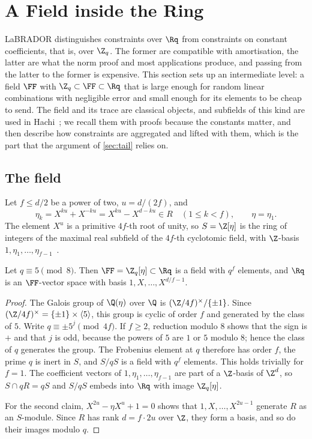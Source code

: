 \section{A Field inside the Ring}\label{sec:field}

LaBRADOR distinguishes constraints over $\Rq$ from constraints on constant coefficients, that is, over $\Z_q$. The former are compatible with amortisation, the latter are what the norm proof and most applications produce, and passing from the latter to the former is expensive. This section sets up an intermediate level: a field $\FF$ with $\Z_q\subset\FF\subset\Rq$ that is large enough for random linear combinations with negligible error and small enough for its elements to be cheap to send. The field and its trace are classical objects, and subfields of this kind are used in Hachi~\cite{NOZ26}; we recall them with proofs because the constants matter, and then describe how constraints are aggregated and lifted with them, which is the part that the argument of \cref{sec:tail} relies on.

\subsection{The field}

Let $f\le d/2$ be a power of two, $u=d/(2f)$, and
\[
\eta_k=X^{ku}+X^{-ku}=X^{ku}-X^{d-ku}\in R\quad(1\le k<f),\qquad \eta=\eta_1 .
\]
The element $X^u$ is a primitive $4f$-th root of unity, so $S=\Z[\eta]$ is the ring of integers of the maximal real subfield of the $4f$-th cyclotomic field, with $\Z$-basis $1,\eta_1,\dots,\eta_{f-1}$~\cite[Proposition~2.16]{Was97}.

\begin{lemma}\label{lem:field}
Let $q\equiv5\pmod8$. Then $\FF=\Z_q[\eta]\subset\Rq$ is a field with $q^f$ elements, and $\Rq$ is an $\FF$-vector space with basis $1,X,\dots,X^{d/f-1}$.
\end{lemma}
\begin{proof}
The Galois group of $\Q(\eta)$ over $\Q$ is $(\Z/4f)^\times/\{\pm1\}$. Since $(\Z/4f)^\times=\{\pm1\}\times\langle5\rangle$, this group is cyclic of order $f$ and generated by the class of $5$. Write $q\equiv\pm5^j\pmod{4f}$. If $f\ge2$, reduction modulo $8$ shows that the sign is $+$ and that $j$ is odd, because the powers of $5$ are $1$ or $5$ modulo $8$; hence the class of $q$ generates the group. The Frobenius element at $q$ therefore has order $f$, the prime $q$ is inert in $S$, and $S/qS$ is a field with $q^f$ elements. This holds trivially for $f=1$. The coefficient vectors of $1,\eta_1,\dots,\eta_{f-1}$ are part of a $\Z$-basis of $\Z^d$, so $S\cap qR=qS$ and $S/qS$ embeds into $\Rq$ with image $\Z_q[\eta]$.

For the second claim, $X^{2u}-\eta X^u+1=0$ shows that $1,X,\dots,X^{2u-1}$ generate $R$ as an $S$-module. Since $R$ has rank $d=f\cdot2u$ over $\Z$, they form a basis, and so do their images modulo $q$.
\end{proof}

